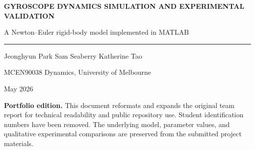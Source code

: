 \documentclass[11pt]{article}
\begin{document}
\hypersetup{pageanchor=false}

\begin{titlepage}
    \centering
    \vspace*{1.0in}
    {\Large\color{navy}\textbf{GYROSCOPE DYNAMICS SIMULATION AND EXPERIMENTAL VALIDATION}\par}
    \vspace{0.25in}
    {\large A Newton--Euler rigid-body model implemented in MATLAB\par}
    \vspace{0.7in}
    \rule{0.82\textwidth}{0.8pt}\par
    \vspace{0.45in}
    {\large Jeonghyun Park \quad Sam Seaberry \quad Katherine Tao\par}
    \vspace{0.15in}
    {\normalsize MCEN90038 Dynamics, University of Melbourne\par}
    {\normalsize May 2026\par}
    \vfill
    \begin{minipage}{0.82\textwidth}
        \small\color{graytext}
        \textbf{Portfolio edition.} This document reformats and expands the original team report for technical readability and public repository use. Student identification numbers have been removed. The underlying model, parameter values, and qualitative experimental comparisons are preserved from the submitted project materials.
    \end{minipage}
    \vspace{0.5in}
\end{titlepage}
\clearpage
{}
\hypersetup{pageanchor=true}
\begin{abstract}
This project develops a three-degree-of-freedom rigid-body model of a laboratory gyroscope and compares its predicted motion with measurements from a sensor mounted on the gyroscope bar. The model represents base precession, bar tilt, and rotor spin through a sequence of rotation matrices, constructs body inertia tensors with cylindrical cutouts, transfers those inertias to the pivot by the parallel-axis theorem, and applies Newton--Euler angular-momentum balance to obtain nonlinear equations of motion. The resulting symbolic equations are converted to numerical functions and integrated in MATLAB using \texttt{ode45}. Simulated angular velocity and sensor acceleration are transformed into the sensor frame and compared against measured signals over short and long time windows. The model reproduces the principal direction and oscillatory structure of gyroscopic precession and nutation, while systematic discrepancies remain because the model neglects friction and drag, approximates some geometry, and uses an estimated initial rotor speed. These differences provide a clear boundary between ideal rigid-body dynamics and the measured behavior of the physical apparatus.
\end{abstract}
\end{document}
